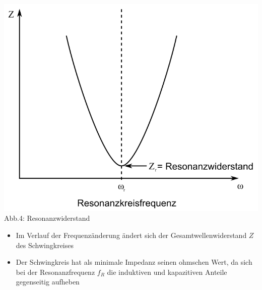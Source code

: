 \begin{frame}
\begin{center}
\begin{minipage}{0.4\textwidth}
	\includegraphics[width=\textwidth,height=.5\textheight,keepaspectratio]{e07/SerirenschwSig.png}\\
	\tiny{Abb.4: Resonanzwiderstand \cite{wmen}} 
	\end{minipage}
\end{center}
\begin{itemize}
	\item Im Verlauf der Frequenzänderung ändert sich der Gesamtwellenwiderstand $Z$ des Schwingkreises
	\item Der Schwingkreis hat als minimale Impedanz seinen ohmschen Wert, da sich bei der Resonanzfrequenz $f_R$ die induktiven und kapazitiven Anteile gegenseitig aufheben
\end{itemize}
\end{frame}

